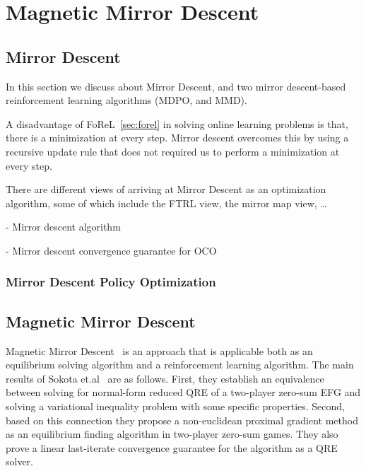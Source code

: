 \chapter{Magnetic Mirror Descent}

\section{Mirror Descent}

In this section we discuss about Mirror Descent, and two mirror descent-based reinforcement
learning algorithms (MDPO, and MMD).

A disadvantage of FoReL~\ref{sec:forel} in solving online learning problems is that, there is a
minimization at every step.
Mirror descent overcomes this by using a recursive update rule that does not required us to perform
a minimization at every step.

There are different views of arriving at Mirror Descent as an optimization algorithm, some of which
include the FTRL view, the mirror map view, \dots

- Mirror descent algorithm

- Mirror descent convergence guarantee for OCO

\subsection[MDPO]{Mirror Descent Policy Optimization}

\section[MMD]{Magnetic
  Mirror Descent}

Magnetic Mirror Descent~\cite{sokotaUnified2023} is an approach
that is applicable both as an equilibrium solving algorithm and a reinforcement learning algorithm.
The main results of Sokota et.al~\cite{sokotaUnified2023} are as follows.
First, they establish an equivalence between solving for normal-form reduced QRE of a two-player
zero-sum EFG and solving a variational inequality problem with some specific properties.
Second, based on this connection they propose a non-euclidean proximal gradient method as an
equilibrium finding algorithm in two-player zero-sum games.
They also prove a linear last-iterate convergence guarantee for the algorithm as a QRE solver.


